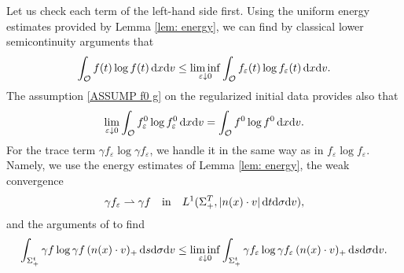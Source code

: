 \documentclass[10pt, reqno]{amsart}
\theoremstyle{plain}
\theoremstyle{definition}
\theoremstyle{remark}
\numberwithin{equation}{section}
\newcommand{\calO}{\mathcal O}
\newcommand{\ve}{\varepsilon}
\newcommand{\dx}{\textnormal{d}x}
\newcommand{\dv}{\textnormal{d}v}
\newcommand{\dt}{\textnormal{d}t}
\newcommand{\ds}{\textnormal{d}s}
\newcommand{\tnd}{\textnormal{d}}
\newcommand{\weakto}{\rightharpoonup}
\begin{document}
Let us check each term of the left-hand side first. Using the uniform energy estimates provided by Lemma \ref{lem: energy}, we can find by classical lower semicontinuity arguments \cite[p.9]{JKO98} that
\begin{align*}
    \int_{\calO} f(t) \log f(t) \,\dx\dv \le \liminf_{\ve\downarrow 0} \int_{\calO} f_\ve(t) \log f_\ve(t) \,\dx\dv .
\end{align*}
The assumption \eqref{ASSUMP f0 g} on the regularized initial data provides also that
\begin{align*}
    \lim_{\ve\downarrow 0} \int_{\calO} f_\ve^0 \log f_\ve^0 \,\dx\dv = \int_{\calO} f^0 \log f^0 \,\dx\dv.
\end{align*}
For the trace term $\gamma f_\ve \log \gamma f_\ve$, we handle it in the same way as in $f_\ve \log f_\ve$. Namely, we use the energy estimates of Lemma \ref{lem: energy}, the weak convergence
\begin{align*}
    \gamma f_\ve \weakto \gamma f \quad \text{in} \quad L^1(\Sigma_+^T, |n(x)\cdot v|\,\dt\tnd\sigma\dv),
\end{align*}
and the arguments of \cite{JKO98} to find
\begin{align*}
    \int_{\Sigma_+^t} \gamma f \log \gamma f \, (n(x)\cdot v)_+ \,\ds\tnd\sigma\dv \le \liminf_{\ve\downarrow 0} \int_{\Sigma_+^t} \gamma f_\ve \log \gamma f_\ve \, (n(x)\cdot v)_+ \,\ds\tnd\sigma\dv.
\end{align*}
\end{document}
